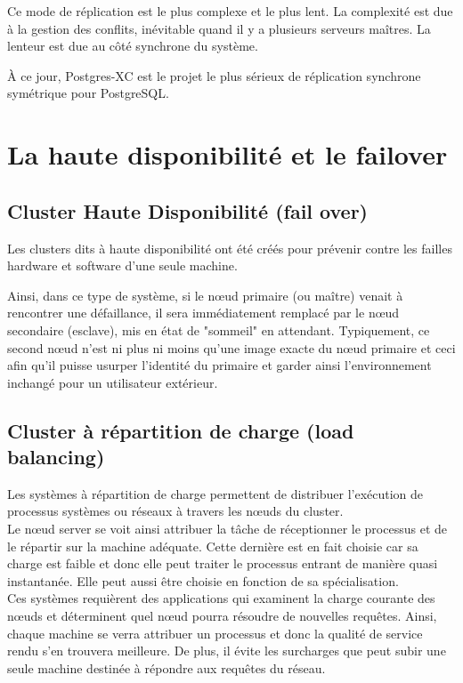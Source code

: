 \documentclass[12pt]{report}
\begin{document}
Ce mode de réplication est le plus complexe et le plus lent. La complexité est
due à la gestion des conflits, inévitable quand il y a plusieurs serveurs
maîtres. La lenteur est due au côté synchrone du système.

À ce jour, Postgres-XC est le projet le plus sérieux de réplication synchrone
symétrique pour PostgreSQL.


\section{La haute disponibilité et le failover}

\subsection{Cluster Haute Disponibilité (fail over)}

Les clusters dits à haute disponibilité ont été créés pour prévenir contre les
failles hardware et software d'une seule machine.

Ainsi, dans ce type de système, si le nœud primaire (ou maître) venait à
rencontrer une défaillance, il sera immédiatement remplacé par le nœud
secondaire (esclave), mis en état de "sommeil" en attendant. Typiquement, ce
second nœud n'est ni plus ni moins qu'une image exacte du nœud primaire et ceci
afin qu'il puisse usurper l'identité du primaire et garder ainsi l'environnement
inchangé pour un utilisateur extérieur. 

\subsection{Cluster à répartition de charge (load balancing)}

Les systèmes à répartition de charge permettent de distribuer l'exécution de
processus systèmes ou réseaux à travers les nœuds du cluster. \\

Le nœud server se voit ainsi attribuer la tâche de réceptionner le processus et
de le répartir sur la machine adéquate. Cette dernière est en fait choisie car
sa charge est faible et donc elle peut traiter le processus entrant de manière
quasi instantanée. Elle peut aussi être choisie en fonction de sa
spécialisation. \\

Ces systèmes requièrent des applications qui examinent la charge courante des
nœuds et déterminent quel nœud pourra résoudre de nouvelles requêtes. Ainsi,
chaque machine se verra attribuer un processus et donc la qualité de service
rendu s'en trouvera meilleure. De plus, il évite les surcharges que peut subir
une seule machine destinée à répondre aux requêtes du réseau. \\
\end{document}
